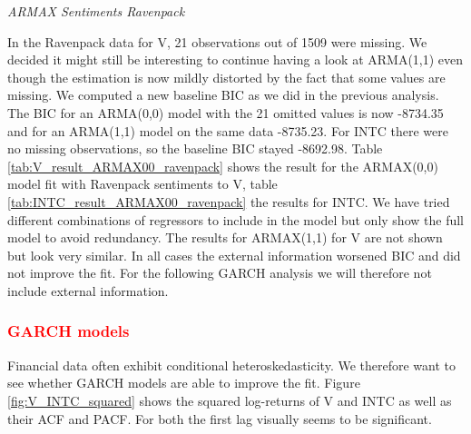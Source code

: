 \textit{ARMAX Sentiments Ravenpack}

In the Ravenpack data for V, 21 observations out of 1509 were missing. We decided it might still be interesting to continue having a look at ARMA(1,1) even though the estimation is now mildly distorted by the fact that some values are missing. We computed a new baseline BIC as we did in the previous analysis. The BIC for an ARMA(0,0) model with the 21 omitted values is now -8734.35 and for an ARMA(1,1) model on the same data -8735.23. For INTC there were no missing observations, so the baseline BIC stayed -8692.98. Table \ref{tab:V_result_ARMAX00_ravenpack} shows the result for the ARMAX(0,0) model fit with Ravenpack sentiments to V, table \ref{tab:INTC_result_ARMAX00_ravenpack} the results for INTC. We have tried different combinations of regressors to include in the model but only show the full model to avoid redundancy. The results for ARMAX(1,1) for V are not shown but look very similar. In all cases the external information worsened BIC and did not improve the fit. For the following GARCH analysis we will therefore not include external information. 

\begin{table}[h]
    \centering
    
    \caption{}
    \label{tab:V_result_ARMAX00_ravenpack}
\end{table}{}

%     

\begin{table}[h!]
    \centering
    
    \caption{}
    \label{tab:INTC_result_ARMAX00_ravenpack}
\end{table}{}

\subsubsection{\textcolor{red}{GARCH models}}
Financial data often exhibit conditional heteroskedasticity. We therefore want to see whether GARCH models are able to improve the fit. Figure \ref{fig:V_INTC_squared} shows the squared log-returns of V and INTC as well as their ACF and PACF. For both the first lag visually seems to be significant. 

